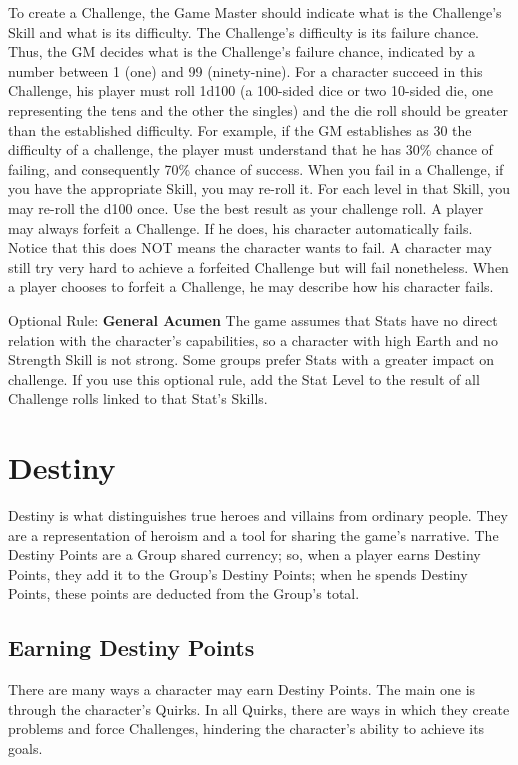 To create a Challenge, the Game Master
should indicate what is the Challenge’s Skill and
what is its difficulty. The Challenge’s difficulty is its
failure chance. Thus, the GM decides what is the
Challenge’s failure chance, indicated by a number
between 1 (one) and 99 (ninety-nine). For a
character succeed in this Challenge, his player
must roll 1d100 (a 100-sided dice or two 10-sided
die, one representing the tens and the other the
singles) and the die roll should be greater than the
established difficulty. For example, if the GM
establishes as 30 the difficulty of a challenge, the
player must understand that he has 30\% chance of
failing, and consequently 70\% chance of success.
When you fail in a Challenge, if you have
the appropriate Skill, you may re-roll it. For each
level in that Skill, you may re-roll the d100 once.
Use the best result as your challenge roll.
A player may always forfeit a Challenge. If
he does, his character automatically fails. Notice
that this does NOT means the character wants to
fail. A character may still try very hard to achieve a
forfeited Challenge but will fail nonetheless. When
a player chooses to forfeit a Challenge, he may
describe how his character fails.

Optional Rule: \textbf{General Acumen}
The game assumes that Stats have no direct
relation with the character's capabilities, so a
character with high Earth and no Strength Skill is
not strong. Some groups prefer Stats with a
greater impact on challenge. If you use this
optional rule, add the Stat Level to the result of
all Challenge rolls linked to that Stat's Skills.

\section{Destiny}
Destiny is what distinguishes true heroes
and villains from ordinary people. They are a
representation of heroism and a tool for sharing
the game's narrative. The Destiny Points are a
Group shared currency; so, when a player earns
Destiny Points, they add it to the Group’s Destiny
Points; when he spends Destiny Points, these
points are deducted from the Group's total.
\subsection{Earning Destiny Points}
There are many ways a character may earn
Destiny Points. The main one is through the
character's Quirks. In all Quirks, there are ways in
which they create problems and force Challenges,
hindering the character’s ability to achieve its
goals.

